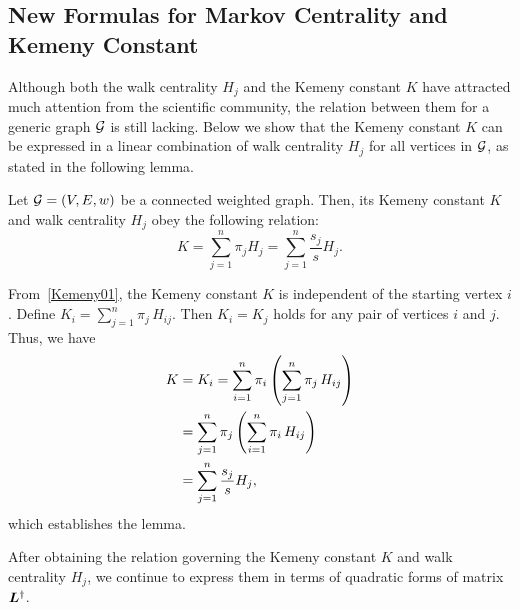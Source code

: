 \documentclass[journal]{IEEEtran}
\begin{document}
\subsection{New Formulas for Markov Centrality and Kemeny Constant}

Although both the walk centrality \(H_j\) and the Kemeny constant \(K\) have attracted much attention from the scientific community, the relation between  them for a generic  graph  \(\mathcal{G}\) is still lacking. Below we show that the Kemeny constant \(K\) can be expressed in a linear combination of walk centrality  \(H_j\) for all vertices in \(\mathcal{G}\), as stated in the following lemma.

\begin{lemma}
    Let \(\mathcal{G}=(V,E,w)\) be a connected weighted graph. Then, its  Kemeny constant \(K\)  and walk centrality \(H_j\) obey the following relation:
    \begin{equation}\label{HjK01}
        K=\sum_{j=1}^{n} \pi_j H_j=\sum_{j=1}^{n} \frac{s_j}{s} H_j.
    \end{equation}
\end{lemma}
\begin{IEEEproof}
    From~\eqref{Kemeny01}, the Kemeny constant \(K\) is independent of the starting vertex \(i\). Define \(K_i =\sum_{j=1}^{n}\pi_j\,H_{ij}\). Then   \(K_i=K_j\) holds for any pair of vertices \(i\) and \(j\). Thus, we have
    \begin{align}\label{Kemeny02}
        K & =K_i =\sum_{i=1}^{n} \pi_i \left( \sum_{j=1}^{n}\pi_j\,H_{ij}\right) \notag \\
          & =\sum_{j=1}^{n} \pi_j \left( \sum_{i=1}^{n}\pi_i\,H_{ij}\right) \notag      \\
          & =\sum_{j=1}^{n} \frac{s_j}{s} H_j,\notag
    \end{align}
    which establishes the lemma.
\end{IEEEproof}

After obtaining the relation governing the Kemeny constant \(K\)  and walk centrality \(H_j\), we continue to express them in terms of quadratic forms of matrix  \(\boldsymbol{L}^{\dagger}\).
\end{document}
